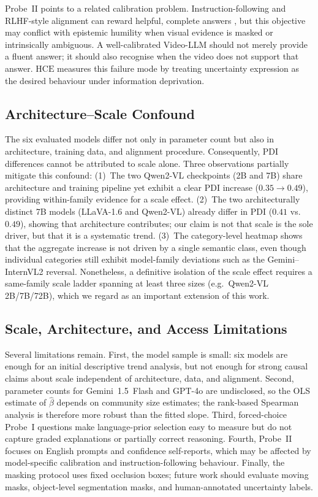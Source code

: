 \documentclass[final,5p,times,twocolumn]{elsarticle}
\newcommand{\HCE}{\mathrm{HCE}}
\begin{document}
Probe~II points to a related calibration problem. Instruction-following and
RLHF-style alignment can reward helpful, complete answers
\cite{ouyang2022training}, but this objective may conflict with epistemic
humility when visual evidence is masked or intrinsically ambiguous. A
well-calibrated Video-LLM should not merely provide a fluent answer; it should
also recognise when the video does not support that answer. $\HCE$ measures
this failure mode by treating uncertainty expression as the desired behaviour
under information deprivation.

\subsection{Architecture--Scale Confound}
\label{sec:arch_confound}
The six evaluated models differ not only in parameter count but also in
architecture, training data, and alignment procedure. Consequently,
PDI differences cannot be attributed to scale alone.
Three observations partially mitigate this confound:
(1)~The two Qwen2-VL checkpoints (2B and 7B) share architecture and
training pipeline yet exhibit a clear PDI increase
($0.35 \to 0.49$), providing within-family evidence for a scale
effect.
(2)~The two architecturally distinct 7B models (LLaVA-1.6 and
Qwen2-VL) already differ in PDI ($0.41$ vs.\ $0.49$), showing
that architecture contributes; our claim is not that scale is the
sole driver, but that it is a systematic trend.
(3)~The category-level heatmap shows that the aggregate increase is not driven
by a single semantic class, even though individual categories still exhibit
model-family deviations such as the Gemini--InternVL2 reversal.
Nonetheless, a definitive isolation of the scale effect requires a
same-family scale ladder spanning at least three sizes (e.g.\
Qwen2-VL 2B/7B/72B), which we regard as an important extension of this work.

\subsection{Scale, Architecture, and Access Limitations}

Several limitations remain. First, the model sample is small: six models are
enough for an initial descriptive trend analysis, but not enough for strong
causal claims about scale independent of architecture, data, and alignment.
Second, parameter counts for Gemini~1.5~Flash and GPT-4o are undisclosed, so
the OLS estimate of $\hat{\beta}$ depends on community size estimates; the
rank-based Spearman analysis is therefore more robust than the fitted slope.
Third, forced-choice Probe~I questions make language-prior selection easy to measure
but do not capture graded explanations or partially correct reasoning. Fourth,
Probe~II focuses on English prompts and confidence self-reports, which may be
affected by model-specific calibration and instruction-following behaviour.
Finally, the masking protocol uses fixed occlusion boxes; future work should
evaluate moving masks, object-level segmentation masks, and human-annotated
uncertainty labels.
\end{document}
